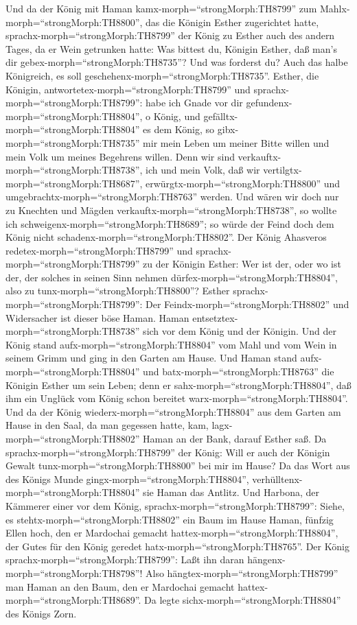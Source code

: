  Und da der König mit Haman
kamx-morph=``strongMorph:TH8799'' zum
Mahlx-morph=``strongMorph:TH8800'', das die Königin Esther zugerichtet
hatte,  sprachx-morph=``strongMorph:TH8799'' der König zu
Esther auch des andern Tages, da er Wein getrunken hatte: Was bittest
du, Königin Esther, daß man's dir gebex-morph=``strongMorph:TH8735''?
Und was forderst du? Auch das halbe Königreich, es soll
geschehenx-morph=``strongMorph:TH8735''.  Esther, die
Königin, antwortetex-morph=``strongMorph:TH8799'' und
sprachx-morph=``strongMorph:TH8799'': habe ich Gnade vor dir
gefundenx-morph=``strongMorph:TH8804'', o König, und
gefälltx-morph=``strongMorph:TH8804'' es dem König, so
gibx-morph=``strongMorph:TH8735'' mir mein Leben um meiner Bitte willen
und mein Volk um meines Begehrens willen.  Denn wir sind
verkauftx-morph=``strongMorph:TH8738'', ich und mein Volk, daß wir
vertilgtx-morph=``strongMorph:TH8687'',
erwürgtx-morph=``strongMorph:TH8800'' und
umgebrachtx-morph=``strongMorph:TH8763'' werden. Und wären wir doch nur
zu Knechten und Mägden verkauftx-morph=``strongMorph:TH8738'', so wollte
ich schweigenx-morph=``strongMorph:TH8689''; so würde der Feind doch dem
König nicht schadenx-morph=``strongMorph:TH8802''.  Der
König Ahasveros redetex-morph=``strongMorph:TH8799'' und
sprachx-morph=``strongMorph:TH8799'' zu der Königin Esther: Wer ist der,
oder wo ist der, der solches in seinen Sinn nehmen
dürfex-morph=``strongMorph:TH8804'', also zu
tunx-morph=``strongMorph:TH8800''?  Esther
sprachx-morph=``strongMorph:TH8799'': Der
Feindx-morph=``strongMorph:TH8802'' und Widersacher ist dieser böse
Haman. Haman entsetztex-morph=``strongMorph:TH8738'' sich vor dem König
und der Königin.  Und der König stand
aufx-morph=``strongMorph:TH8804'' vom Mahl und vom Wein in seinem Grimm
und ging in den Garten am Hause. Und Haman stand
aufx-morph=``strongMorph:TH8804'' und batx-morph=``strongMorph:TH8763''
die Königin Esther um sein Leben; denn er
sahx-morph=``strongMorph:TH8804'', daß ihm ein Unglück vom König schon
bereitet warx-morph=``strongMorph:TH8804''.  Und da der
König wiederx-morph=``strongMorph:TH8804'' aus dem Garten am Hause in
den Saal, da man gegessen hatte, kam, lagx-morph=``strongMorph:TH8802''
Haman an der Bank, darauf Esther saß. Da
sprachx-morph=``strongMorph:TH8799'' der König: Will er auch der Königin
Gewalt tunx-morph=``strongMorph:TH8800'' bei mir im Hause? Da das Wort
aus des Königs Munde gingx-morph=``strongMorph:TH8804'',
verhülltenx-morph=``strongMorph:TH8804'' sie Haman das Antlitz.
 Und Harbona, der Kämmerer einer vor dem König,
sprachx-morph=``strongMorph:TH8799'': Siehe, es
stehtx-morph=``strongMorph:TH8802'' ein Baum im Hause Haman, fünfzig
Ellen hoch, den er Mardochai gemacht
hattex-morph=``strongMorph:TH8804'', der Gutes für den König geredet
hatx-morph=``strongMorph:TH8765''. Der König
sprachx-morph=``strongMorph:TH8799'': Laßt ihn daran
hängenx-morph=``strongMorph:TH8798''!  Also
hängtex-morph=``strongMorph:TH8799'' man Haman an den Baum, den er
Mardochai gemacht hattex-morph=``strongMorph:TH8689''. Da legte
sichx-morph=``strongMorph:TH8804'' des Königs Zorn.

